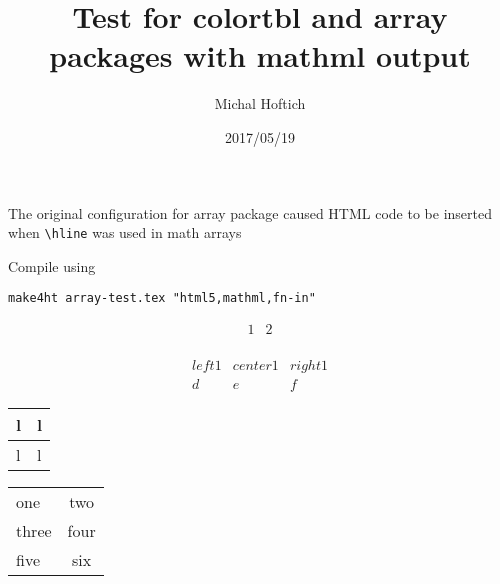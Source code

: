 \documentclass[12pt]{article}
\date{2017/05/19}
\author{Michal Hoftich}
\title{Test for colortbl and array packages with mathml output}
\begin{document}
\maketitle

The original configuration for array package caused HTML code to be inserted when \verb|\hline| was used
in math arrays

Compile using

\begin{verbatim}
make4ht array-test.tex "html5,mathml,fn-in"
\end{verbatim}


\[\begin{array}{|l|c|} \hline 1 & 2\\ \end{array}\]


\[
\begin{array}{|l|cr}
  left1 & center1 & right1\\
  \hline
  d & e & f
\end{array} 
\]

\begin{tabular}{l|l}
  l & l\\
  \hline
  l & l\\
\end{tabular}

\noindent\begin{tabular}{|l|c|}
  \rowcolor{maroon}
  one & two \\
  \rowcolor{maroon!50}
  three & four \\
  \rowcolor{maroon!10}
  five & six
\end{tabular}
\end{document}
